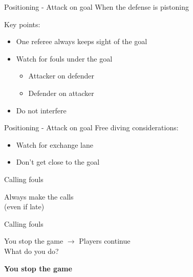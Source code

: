 \documentclass{beamer}
\begin{document}
    \begin{frame}{Positioning - Attack on goal}
        When the defense is pistoning

        \pause

        \vspace{0.75cm}

        Key points:
        \begin{itemize}
            \item One referee always keeps sight of the goal
            \item Watch for fouls under the goal
            \begin{itemize}
                \item Attacker on defender
                \item Defender on attacker
            \end{itemize}
            \item Do not interfere
        \end{itemize}
    \end{frame}

    \begin{frame}{Positioning - Attack on goal}
        Free diving considerations:
        \begin{itemize}
            \item Watch for exchange lane
            \item Don't get close to the goal
        \end{itemize}
    \end{frame}

    \begin{frame}{Calling fouls}
        \begin{center}
            Always make the calls \\
            (even if late)
        \end{center}
    \end{frame}

    \begin{frame}{Calling fouls}
        \begin{center}
        You stop the game \pause $\rightarrow$ Players continue \\
        What do you do? \\

        \pause

        \textbf{You stop the game}
        \end{center}
    \end{frame}
\end{document}
